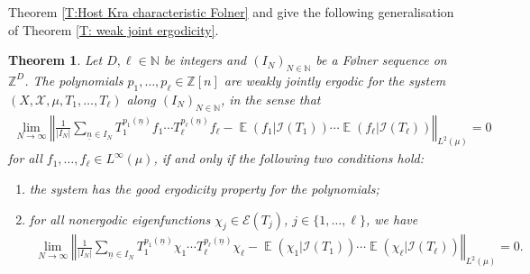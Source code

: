 \documentclass[11pt]{amsart}
\newtheorem{theorem}[lemma]{Theorem}
\newtheorem{corollary}[lemma]{Corollary}
\theoremstyle{definition}
\newcommand{\N}{{\mathbb N}}
\newcommand{\Z}{{\mathbb Z}}
\newcommand{\CE}{{\mathcal E}}
\newcommand{\CI}{{\mathcal I}}
\newcommand{\CX}{{\mathcal X}}
\newcommand{\un}{{\underline{n}}}
\newcommand{\norm}[1]{\left\Vert #1\right\Vert}
\DeclareMathOperator*{\E}{\mathbb{E}}
\begin{document}
Theorem \ref{T:Host Kra characteristic Folner} and  \cite[Theorem~2.7]{FrKu22} give the following generalisation of Theorem \ref{T: weak joint ergodicity}.
\begin{theorem}\label{T: weak joint ergodicity Folner}
    Let $D, \ell\in\N$ be integers and  $(I_N)_{N\in\N}$ be a F\o lner sequence on $\Z^D$.
     The polynomials $p_1, \ldots, p_\ell\in \Z[n]$ are weakly jointly ergodic for the system $(X,\CX, \mu,T_1, \ldots, T_\ell)$ along $(I_N)_{N\in\N}$, in the sense that
    \begin{align*}%
    \lim_{N\to\infty}\norm{\frac{1}{|I_N|}\sum_{\un\in I_N} T_1^{p_1(\un)}f_1 \cdots T_\ell^{p_\ell(\un)}f_\ell -
    \E(f_1|\CI(T_1)) \cdots \E(f_\ell|\CI(T_\ell))}_{L^2(\mu)} = 0
    \end{align*}
    for all $f_1, \ldots, f_\ell\in L^\infty(\mu)$, if and only if the following two conditions hold:
    \begin{enumerate}
        \item the system has the good ergodicity property for the polynomials;
        \item for all nonergodic eigenfunctions $\chi_j\in \CE(T_j)$, $j\in\{1, \ldots, \ell\}$, we have
        \begin{align*}%
            \lim_{N\to\infty}\norm{\frac{1}{|I_N|}\sum_{\un\in I_N} T_1^{p_1(\un)}\chi_1 \cdots T_\ell^{p_\ell(\un)}\chi_\ell -
            \E(\chi_1|\CI(T_1)) \cdots \E(\chi_\ell|\CI(T_\ell))}_{L^2(\mu)} = 0.
        \end{align*}
    \end{enumerate}
\end{theorem}
\end{document}
